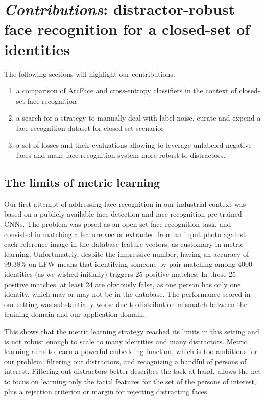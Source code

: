 \section{\arr \emph{Contributions}: distractor-robust face recognition for a closed-set of identities}
\label{sec:our-facerec}
The following sections will highlight our contributions:

\begin{enumerate}
    \item a comparison of ArcFace and cross-entropy classifiers in the context of closed-set face recognition
    \item a search for a strategy to manually deal with label noise, curate and expend a face recognition dataset for closed-set scenarios
    \item a set of losses and their evaluations allowing to leverage unlabeled negative faces and make face recognition system more robust to distractors. 
\end{enumerate}

\subsection{The limits of metric learning}

Our first attempt of addressing face recognition in our industrial context was based on a publicly available face detection and face recognition pre-trained CNNs. The problem was posed as an open-set face recognition task, and consisted in matching a feature vector extracted from an input photo against each reference image in the database feature vectors, as customary in metric learning. Unfortunately, despite the impressive number, having an accuracy of 99.38\% on LFW means that identifying someone by pair matching among 4000 identities (as we wished initially) triggers 25 positive matches. In those 25 positive matches, at least 24 are obviously false, as one person has only one identity, which may or may not be in the database. The performance scored in our setting was substantially worse due to distribution mismatch between the training domain and our application domain.

This shows that the metric learning strategy reached its limits in this setting and is not robust enough to scale to many identities and many distractors. Metric learning aims to learn a powerful embedding function, which is too ambitious for our problem: filtering out distractors, and recognizing a handful of persons of interest. Filtering out distractors better describes the task at hand, allows the net to focus on learning only the facial features for the set of the persons of interest, plus a rejection criterion or margin for rejecting distracting faces.

